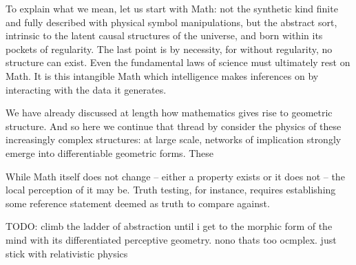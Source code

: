 To explain what we mean, let us start with Math: not the synthetic kind finite and fully described with physical symbol manipulations, but the abstract sort, intrinsic to the latent causal structures of the universe, and born within its pockets of regularity. The last point is by necessity, for without regularity, no structure can exist.  Even the fundamental laws of science must ultimately rest on Math. It is this intangible Math which intelligence makes inferences on by interacting with the data it generates.

We have already discussed at length how mathematics gives rise to geometric structure. And so here we continue that thread by consider the physics of these increasingly complex structures: at large scale, networks of implication strongly emerge into differentiable geometric forms. These


While Math itself does not change -- either a property exists or it does not -- the local perception of it may be. Truth testing, for instance, requires establishing some reference statement deemed as truth to compare against.

TODO: climb the ladder of abstraction until i get to the morphic form of the mind with its differentiated perceptive geometry. nono thats too ocmplex. just stick with relativistic physics